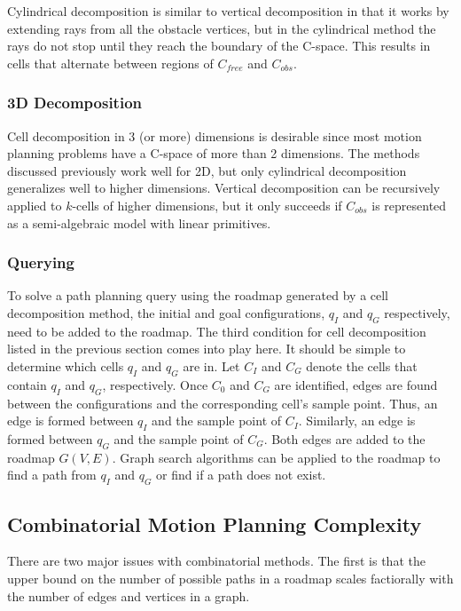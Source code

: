 \documentclass[10pt,conference]{ieeeconf}
\begin{document}
Cylindrical decomposition is similar to vertical decomposition in that it works by extending rays from all the obstacle vertices, but in the cylindrical method the rays do not stop until they reach the boundary of the C-space. This results in cells that alternate between regions of $C_{free}$ and $C_{obs}$. 

\subsubsection{3D Decomposition}

Cell decomposition in 3 (or more) dimensions is desirable since most motion planning problems have a C-space of more than 2 dimensions. The methods discussed previously work well for 2D, but only cylindrical decomposition generalizes well to higher dimensions. Vertical decomposition can be recursively applied to $k$-cells of higher dimensions, but it only succeeds if $C_{obs}$ is represented as a semi-algebraic model with linear primitives. 

\subsubsection{Querying}

To solve a path planning query using the roadmap generated by a cell decomposition method, the initial and goal configurations, $q_I$ and $q_G$ respectively, need to be added to the roadmap. The third condition for cell decomposition listed in the previous section comes into play here. It should be simple to determine which cells $q_I$ and $q_G$ are in. Let $C_I$ and $C_G$ denote the cells that contain $q_I$ and $q_G$, respectively. Once $C_0$ and $C_G$ are identified, edges are found between the configurations and the corresponding cell's sample point. Thus, an edge is formed between $q_I$ and the sample point of $C_I$. Similarly, an edge is formed between $q_G$ and the sample point of $C_G$. Both edges are added to the roadmap $G(V,E)$. Graph search algorithms can be applied to the roadmap to find a path from $q_I$ and $q_G$ or find if a path does not exist.


\subsection{Combinatorial Motion Planning Complexity}

There are two major issues with combinatorial methods. The first is that the upper bound on the number of possible paths in a roadmap scales factiorally with the number of edges and vertices in a graph. 
\end{document}
